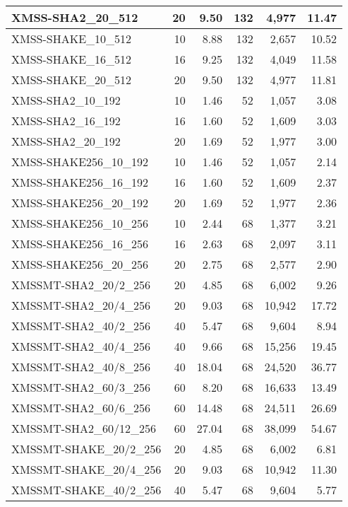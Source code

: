 \documentclass{article}
\begin{document}
\begin{table}[tbp]
\begin{tabular}{|l|r|r|r|r|r|}
    XMSS-SHA2\_20\_512 & 20 & 9.50 & 132 & 4,977 & 11.47 \\ \hline
    XMSS-SHAKE\_10\_512 & 10 & 8.88 & 132 & 2,657 & 10.52 \\ \hline
    XMSS-SHAKE\_16\_512 & 16 & 9.25 & 132 & 4,049 & 11.58 \\ \hline
    XMSS-SHAKE\_20\_512 & 20 & 9.50 & 132 & 4,977 & 11.81 \\ \hline
    XMSS-SHA2\_10\_192 & 10 & 1.46 & 52 & 1,057 & 3.08 \\ \hline
    XMSS-SHA2\_16\_192 & 16 & 1.60 & 52 & 1,609 & 3.03 \\ \hline
    XMSS-SHA2\_20\_192 & 20 & 1.69 & 52 & 1,977 & 3.00 \\ \hline
    XMSS-SHAKE256\_10\_192 & 10 & 1.46 & 52 & 1,057 & 2.14 \\ \hline
    XMSS-SHAKE256\_16\_192 & 16 & 1.60 & 52 & 1,609 & 2.37 \\ \hline
    XMSS-SHAKE256\_20\_192 & 20 & 1.69 & 52 & 1,977 & 2.36 \\ \hline
    XMSS-SHAKE256\_10\_256 & 10 & 2.44 & 68 & 1,377 & 3.21 \\ \hline
    XMSS-SHAKE256\_16\_256 & 16 & 2.63 & 68 & 2,097 & 3.11 \\ \hline
    XMSS-SHAKE256\_20\_256 & 20 & 2.75 & 68 & 2,577 & 2.90 \\ \hline
    XMSSMT-SHA2\_20/2\_256 & 20 & 4.85 & 68 & 6,002 & 9.26 \\ \hline
    XMSSMT-SHA2\_20/4\_256 & 20 & 9.03 & 68 & 10,942 & 17.72 \\ \hline
    XMSSMT-SHA2\_40/2\_256 & 40 & 5.47 & 68 & 9,604 & 8.94 \\ \hline
    XMSSMT-SHA2\_40/4\_256 & 40 & 9.66 & 68 & 15,256 & 19.45 \\ \hline
    XMSSMT-SHA2\_40/8\_256 & 40 & 18.04 & 68 & 24,520 & 36.77 \\ \hline
    XMSSMT-SHA2\_60/3\_256 & 60 & 8.20 & 68 & 16,633 & 13.49 \\ \hline
    XMSSMT-SHA2\_60/6\_256 & 60 & 14.48 & 68 & 24,511 & 26.69 \\ \hline
    XMSSMT-SHA2\_60/12\_256 & 60 & 27.04 & 68 & 38,099 & 54.67 \\ \hline
    XMSSMT-SHAKE\_20/2\_256 & 20 & 4.85 & 68 & 6,002 & 6.81 \\ \hline
    XMSSMT-SHAKE\_20/4\_256 & 20 & 9.03 & 68 & 10,942 & 11.30 \\ \hline
    XMSSMT-SHAKE\_40/2\_256 & 40 & 5.47 & 68 & 9,604 & 5.77 \\ \hline

\end{tabular}
\end{table}
\end{document}
